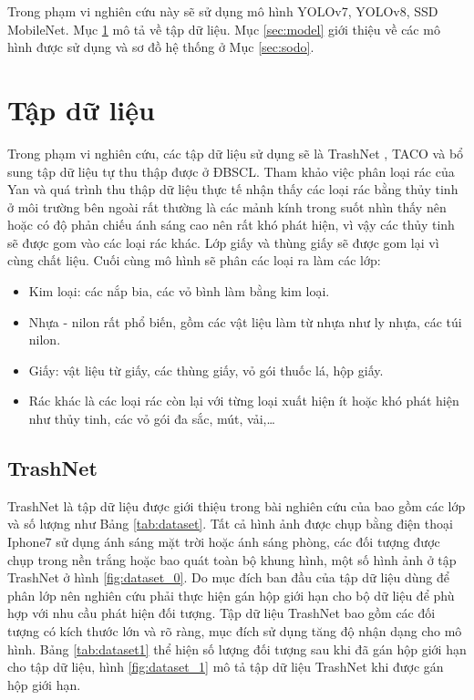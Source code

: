 \documentclass[../the.tex]{subfiles}
\begin{document}
{\fontsize{13}{12} \selectfont

Trong phạm vi nghiên cứu này sẽ sử dụng mô hình YOLOv7, YOLOv8, SSD MobileNet. Mục \ref{sec:dataset} mô tả về tập dữ liệu. Mục \ref{sec:model} giới thiệu về các mô hình được sử dụng và sơ đồ hệ thống ở Mục \ref{sec:sodo}.

}
\section{Tập dữ liệu}
\label{sec:dataset}

{\fontsize{13}{12} \selectfont

	Trong phạm vi nghiên cứu, các tập dữ liệu sử dụng sẽ là TrashNet \cite{yang2016classification}, TACO \cite{proença2020taco} và bổ sung tập dữ liệu tự thu thập được ở ĐBSCL.
	Tham khảo việc phân loại rác của Yan \cite{yang2016classification} và quá trình thu thập dữ liệu thực tế nhận thấy các loại rác bằng thủy tinh ở môi trường bên ngoài rất thường là các mảnh kính trong suốt nhìn thấy nên hoặc có độ phản chiếu ánh sáng cao nên rất khó phát hiện, vì vậy các thủy tinh sẽ được gom vào các loại rác khác.
	Lớp giấy và thùng giấy sẽ được gom lại vì cùng chất liệu. Cuối cùng mô hình sẽ phân các loại ra làm các lớp:
	\begin{itemize}
		\item Kim loại: các nắp bia, các vỏ bình làm bằng kim loại.
		\item Nhựa - nilon rất phổ biến, gồm các vật liệu làm từ nhựa như ly nhựa, các túi nilon.
		\item Giấy: vật liệu từ giấy, các thùng giấy, vỏ gói thuốc lá, hộp giấy.
		\item Rác khác là các loại rác còn lại với từng loại xuất hiện ít hoặc khó phát hiện như thủy tinh, các vỏ gói đa sắc,
		      mút, vải,\dots
	\end{itemize}
}

\subsection{TrashNet}
\label{sec:trashnet}
{\fontsize{13}{12} \selectfont

	TrashNet là tập dữ liệu được giới thiệu trong bài nghiên cứu của \cite{yang2016classification} bao gồm các lớp và số lượng như Bảng \ref{tab:dataset}. Tất cả hình ảnh được chụp bằng điện thoại Iphone7 sử dụng ánh sáng mặt trời hoặc ánh sáng phòng, các đối tượng được chụp trong nền trắng hoặc bao quát toàn bộ khung hình, một số hình ảnh ở tập TrashNet ở hình
	\ref{fig:dataset_0}.
	Do mục đích ban đầu của tập dữ liệu dùng để phân lớp nên nghiên cứu phải thực hiện gán hộp giới hạn cho bộ dữ liệu để phù hợp với nhu cầu phát hiện đối tượng. Tập dữ liệu TrashNet bao gồm các đối tượng có kích thước lớn và rõ ràng, mục đích sử dụng tăng độ nhận dạng cho mô hình. Bảng \ref{tab:dataset1} thể hiện số lượng đối tượng sau khi đã gán hộp giới hạn cho tập dữ liệu, hình
	\ref{fig:dataset_1} mô tả tập dữ liệu TrashNet khi được gán hộp giới hạn.

}
\end{document}
